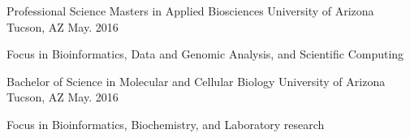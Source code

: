 

\begin{cventries}

  \cventry
    {Professional Science Masters in Applied Biosciences} %
    {University of Arizona} %
    {Tucson, AZ} %
    {May. 2016} %
    {
      \begin{cvitems} %
        \item {Focus in Bioinformatics, Data and Genomic Analysis, and Scientific Computing}
      \end{cvitems}
    }
  \cventry
    {Bachelor of Science in Molecular and Cellular Biology} %
    {University of Arizona} %
    {Tucson, AZ} %
    {May. 2016} %
    {
      \begin{cvitems} %
        \item {Focus in Bioinformatics, Biochemistry, and Laboratory research}
      \end{cvitems}
    }
\end{cventries}
